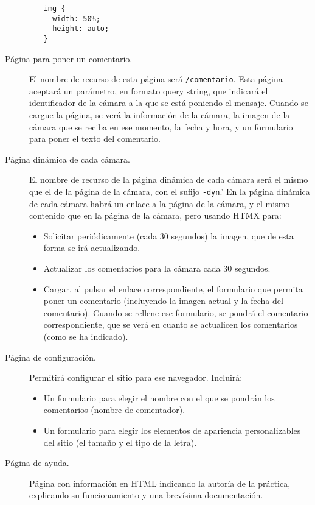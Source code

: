 \begin{description}
\begin{itemize}
\begin{verbatim}
img {
  width: 50%;
  height: auto;
}
\end{verbatim}

  \end{itemize}

\item[Página para poner un comentario.] El nombre de recurso de esta página será \verb|/comentario|. Esta página aceptará un parámetro, en formato query string, que indicará el identificador de la cámara a la que se está poniendo el mensaje. Cuando se cargue la página, se verá la información de la cámara, la imagen de la cámara que se reciba en ese momento, la fecha y hora, y un formulario para poner el texto del comentario.
  
\item[Página dinámica de cada cámara.] El nombre de recurso de la página dinámica de cada cámara será el mismo que el de la página de la cámara, con el sufijo \verb|-dyn|.' En la página dinámica de cada cámara habrá un enlace a la página de la cámara, y el mismo contenido que en la página de la cámara, pero usando HTMX para:

  \begin{itemize}
  \item Solicitar periódicamente (cada 30 segundos) la imagen, que de esta forma se irá actualizando.
  \item Actualizar los comentarios para la cámara cada 30 segundos. 
  \item Cargar, al pulsar el enlace correspondiente, el formulario que permita poner un comentario (incluyendo la imagen actual y la fecha del comentario). Cuando se rellene ese formulario, se pondrá el comentario correspondiente, que se verá en cuanto se actualicen los comentarios (como se ha indicado).
  \end{itemize}
  
\item[Página de configuración.] Permitirá configurar el sitio para ese navegador. Incluirá:
  \begin{itemize}
  \item Un formulario para elegir el nombre con el que se pondrán los comentarios (nombre de comentador).
  \item Un formulario para elegir los elementos de apariencia personalizables del sitio (el tamaño y el tipo de la letra).
  \end{itemize}
\item[Página de ayuda.] Página con información en HTML indicando la autoría de la práctica, explicando su funcionamiento y una brevísima documentación.
\end{description}

